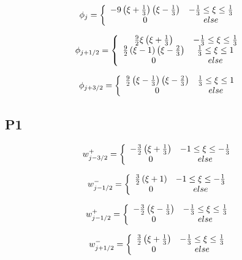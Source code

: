 \documentclass[12pt]{article}
\begin{document}
\[\phi_{j} =  \left\lbrace \begin{array}{c c}
-9\left(\xi + \frac{1}{3}\right)\left(\xi - \frac{1}{3}\right) & -\frac{1}{3} \le \xi \le \frac{1}{3}\\
0 & else
\end{array} \right. \]

\[\phi_{j+1/2} =  \left\lbrace \begin{array}{c c}
\frac{9}{2}\xi\left(\xi + \frac{1}{3}\right)  & -\frac{1}{3} \le \xi \le \frac{1}{3}\\
\frac{9}{2}\left(\xi -1 \right)\left(\xi -\frac{2}{3}\right) & \frac{1}{3} \le \xi \le 1 \\
0 & else
\end{array} \right. \]

\[\phi_{j+3/2} =  \left\lbrace \begin{array}{c c}
\frac{9}{2}\left(\xi - \frac{1}{3}\right)\left(\xi - \frac{2}{3}\right) & \frac{1}{3} \le \xi \le 1\\
0 & else
\end{array} \right. \]

\subsection{P1}

\[w_{j-3/2}^+ =  \left\lbrace \begin{array}{c c}
-\frac{3}{2}\left(\xi + \frac{1}{3}\right) & -1 \le \xi \le -\frac{1}{3}\\
0 & else
\end{array} \right. \]

\[w_{j-1/2}^- =  \left\lbrace \begin{array}{c c}
\frac{3}{2}\left(\xi + 1\right) & -1 \le \xi \le -\frac{1}{3}\\
0 & else
\end{array} \right. \]

\[w_{j-1/2}^+ =  \left\lbrace \begin{array}{c c}
-\frac{3}{2}\left(\xi -  \frac{1}{3}\right) & -\frac{1}{3} \le \xi \le \frac{1}{3}\\
0 & else
\end{array} \right. \]

\[w_{j+1/2}^- =  \left\lbrace \begin{array}{c c}
\frac{3}{2}\left(\xi +  \frac{1}{3}\right) & -\frac{1}{3} \le \xi \le \frac{1}{3}\\
0 & else
\end{array} \right. \]
\end{document}
